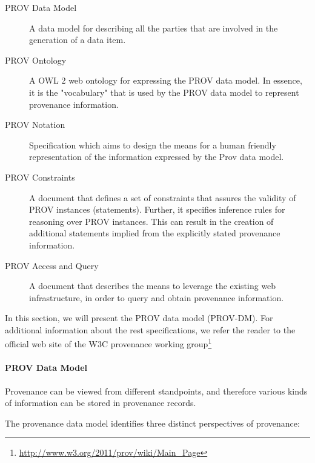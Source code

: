 \begin{description}
  \item[PROV Data Model]
        A data model for describing all the parties that are involved in the generation of a data item\cite{reference15}.
  \item[PROV Ontology]
        A OWL 2 web ontology for expressing the PROV data model. In essence, it is the "vocabulary" that is used by the PROV data model to represent provenance information\cite{prov-ontology}.
  \item[PROV Notation]
        Specification which aims to design the means for a human friendly representation of the information expressed by the Prov data model\cite{prov-notation}.
  \item[PROV Constraints]
         A document that defines a set of constraints that assures the validity of PROV instances (statements). Further, it specifies inference rules for reasoning over PROV instances. This can result in the creation of additional statements implied from the explicitly stated provenance information\cite{prov-constraints}.
  \item[PROV Access and Query]
        A document that describes the means to leverage the existing web infrastructure, in order to query and obtain provenance information\cite{prov-AQ}.
\end{description}

In this section, we will present the PROV data model (PROV-DM). For additional information about the rest specifications, we refer the reader to the official web site  of the W3C provenance working group\footnote{\url{http://www.w3.org/2011/prov/wiki/Main_Page}}


\paragraph{PROV Data Model}
Provenance can be viewed from different standpoints, and therefore various kinds of information can be stored in provenance records\cite{reference14}.

The provenance data model identifies three distinct perspectives of provenance:

